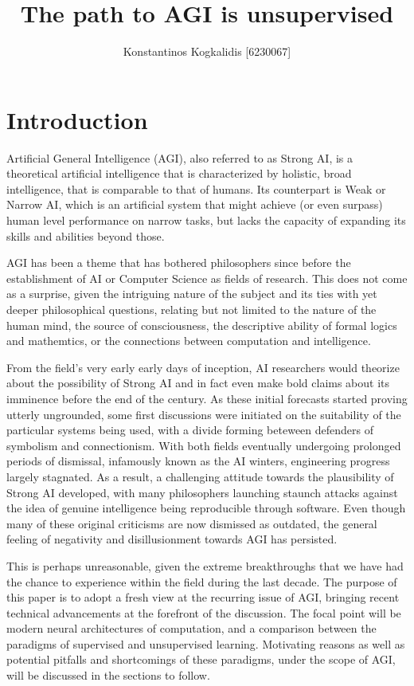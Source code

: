 \documentclass[]{article}
\begin{document}
\author{Konstantinos Kogkalidis [6230067]}
\title{The path to AGI is unsupervised}
\maketitle

\section{Introduction}
Artificial General Intelligence (AGI), also referred to as Strong AI, is a theoretical artificial intelligence that is characterized by holistic, broad intelligence, that is comparable to that of humans. Its counterpart is Weak or Narrow AI, which is an artificial system that might achieve (or even surpass) human level performance on narrow tasks, but lacks the capacity of expanding its skills and abilities beyond those.

AGI has been a theme that has bothered philosophers since before the establishment of AI or Computer Science as fields of research. This does not come as a surprise, given the intriguing nature of the subject and its ties with yet deeper philosophical questions, relating but not limited to the nature of the human mind, the source of consciousness, the descriptive ability of formal logics and mathemtics, or the connections between computation and intelligence. 

From the field's very early early days of inception, AI researchers would theorize about the possibility of Strong AI and in fact even make bold claims about its imminence before the end of the century. As these initial forecasts started proving utterly ungrounded, some first discussions were initiated on the suitability of the particular systems being used, with a divide forming beteween defenders of symbolism and connectionism. With both fields eventually undergoing prolonged periods of dismissal, infamously known as the AI winters, engineering progress largely stagnated. As a result, a challenging attitude towards the plausibility of Strong AI developed, with many philosophers launching staunch attacks against the idea of genuine intelligence being reproducible through software. Even though many of these original criticisms are now dismissed as outdated, the general feeling of negativity and disillusionment towards AGI has persisted. 

This is perhaps unreasonable, given the extreme breakthroughs that we have had the chance to experience within the field during the last decade. The purpose of this paper is to adopt a fresh view at the recurring issue of AGI, bringing recent technical advancements at the forefront of the discussion. The focal point will be modern neural architectures of computation, and a comparison between the paradigms of supervised and unsupervised learning. Motivating reasons as well as potential pitfalls and shortcomings of these paradigms, under the scope of AGI, will be discussed in the sections to follow.
\end{document}

